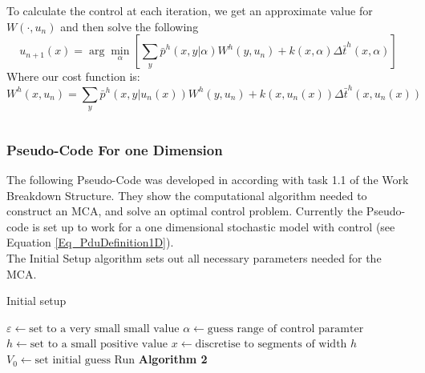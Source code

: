 \documentclass[11pt,draftd]{article}
\begin{document}
To calculate the control at each iteration, we get an approximate value for $ W(\cdot,u_n) $ and then solve the following
\begin{equation}
u_{n+1}(x) = \arg\min_{\alpha}\left[\sum_{y}\bar{p}^{h}(x,y|\alpha)W^{h}(y,u_{n}) + k(x,\alpha) \Delta\bar{t}^{h}(x,\alpha)\right]
\end{equation}
Where our cost function is:
\begin{equation}
W^{h}(x, u_{n}) = \sum_{y}\bar{p}^{h}(x,y|u_{n}(x))W^{h}(y,u_{n}) + k(x,u_{n}(x)) \Delta\bar{t}^{h}(x,u_{n}(x))
\end{equation}

\[\]
\subsubsection{Pseudo-Code For one Dimension}
The following Pseudo-Code was developed in according with task 1.1 of the Work Breakdown Structure. They show the computational algorithm needed to construct an MCA, and solve an optimal control problem. Currently the Pseudo-code is set up to work for a one dimensional stochastic model with control (see Equation \eqref{Eq_PduDefinition1D}). \\

The Initial Setup algorithm sets out all necessary parameters needed for the MCA.

\begin{algorithm}[H]
	\label{alg-setup}
	\caption{Initial setup}
	\begin{algorithmic}[1]
		\State $\varepsilon \gets \text{set to a very small small value}$
		\State $\alpha \gets \text{guess range of control paramter} $
		\State $h \gets \text{set to a small positive value} $
		\State $ x \gets \text{discretise to segments of width } h$
		\State $ V_0 \gets \text{set initial guess} $
		\State Run \textbf{Algorithm 2}
		\EndProcedure{}
	\end{algorithmic}
\end{algorithm}
\end{document}
